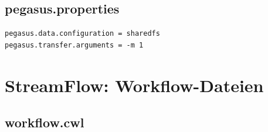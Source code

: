 \section{pegasus.properties}
\label{app:pegasus:properties}

\begin{lstlisting}[caption={pegasus.properties: Globale Konfiguration},
                   label={lst:app:pegasus:properties}]
pegasus.data.configuration = sharedfs
pegasus.transfer.arguments = -m 1
\end{lstlisting}

\chapter{StreamFlow: Workflow-Dateien}
\label{app:streamflow}

\section{workflow.cwl}
\label{app:streamflow:cwl}

